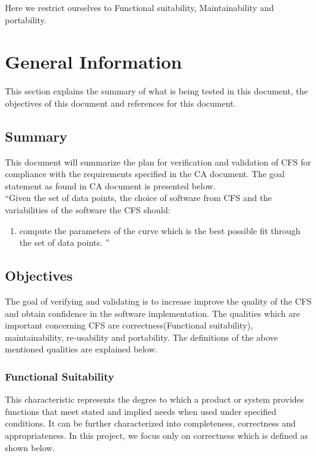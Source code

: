 \documentclass[12pt, titlepage]{article}
\newcommand{\famname}{CFS} %
\begin{document}
Here we restrict ourselves to Functional suitability, Maintainability and portability. 


\section{General Information}

This section explains the summary of what is being tested in this document, the objectives of this document and references for this document. 


\subsection{Summary}

This document will summarize the plan for verification and validation of \famname{} for compliance with the requirements specified in the CA document. 
The goal statement as found in CA document is presented below.\\
\noindent ``Given the set of data points, the choice of software from \famname{} and the variabilities of the software the \famname{} should:

\begin{enumerate}
	
	\item compute the parameters of the curve which is the best possible fit through the set of data points.	''
\end{enumerate}


\subsection{Objectives}

The goal of verifying and validating is to increase improve the quality of the \famname{} and obtain confidence in the software implementation. The qualities which are important concerning \famname{} are correctness(Functional suitability), maintainability, re-usability and portability. The definitions of the above mentioned qualities are explained below.

\subsubsection {Functional Suitability}

This characteristic represents the degree to which a product or system provides
functions that meet stated and implied needs when used under specified
conditions. It can be further characterized into completeness, correctness and
appropriateness. In this project, we focus only on correctness which is defined as shown below.
\end{document}
